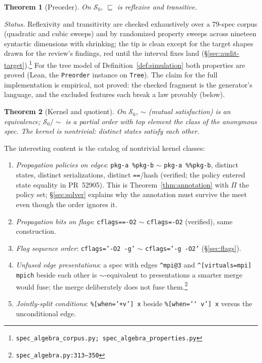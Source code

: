 \documentclass[11pt]{article}
\newtheorem{theorem}{Theorem}[section]
\theoremstyle{definition}
\theoremstyle{remark}
\newcommand{\sat}{\sqsubseteq}
\renewcommand{\ker}{\sim}
\newcommand{\Spec}{\mathcal{S}}
\newcommand{\code}[1]{\texttt{#1}}
\newcommand{\src}[1]{\footnote{\code{#1}}}
\begin{document}
\begin{theorem}[Preorder]\label{thm:preorder}
On $\Spec_0$, $\sat$ is reflexive and transitive.
\end{theorem}

\emph{Status.}  Reflexivity and transitivity are checked exhaustively over a
79-spec corpus (quadratic and cubic sweeps) and by randomized property
sweeps across nineteen syntactic dimensions with shrinking; the tip is
clean except for the target shapes drawn for the review's findings, red
until the interval fixes land
(\S\ref{sec:audit-target}).\src{spec\_algebra\_corpus.py;
spec\_algebra\_properties.py}  For the
tree model of Definition~\ref{def:simulation} both properties are proved
(Lean, the \code{Preorder} instance on \code{Tree}).  The claim for the full implementation is empirical,
not proved: the checked fragment is the generator's language, and the
excluded features each break a law provably (below).

\begin{theorem}[Kernel and quotient]\label{thm:kernel}
On $\Spec_0$, $\ker$ (mutual satisfaction) is an equivalence;
$\Spec_0/\!\ker$ is a partial order with top element the class of the
anonymous spec.  The kernel is nontrivial: distinct states satisfy each other.
\end{theorem}

The interesting content is the catalog of nontrivial kernel classes:

\begin{enumerate}[itemsep=2pt]
\item \emph{Propagation policies on edges}: \code{pkg-a \%pkg-b} $\ker$
      \code{pkg-a \%\%pkg-b}, distinct states, distinct serializations,
      distinct \code{==}/hash (verified; the policy entered state equality in
      PR~52905).  This is Theorem~\ref{thm:annotation} with $\Pi$ the policy
      set; \S\ref{sec:solver} explains why the annotation must survive the
      meet even though the order ignores it.
\item \emph{Propagation bits on flags}: \code{cflags==-O2} $\ker$
      \code{cflags=-O2} (verified), same construction.
\item \emph{Flag sequence order}: \code{cflags='-O2 -g'} $\ker$
      \code{cflags='-g -O2'} (\S\ref{sec:flags}).
\item \emph{Unfused edge presentations}: a spec with edges
      \code{\^{}mpi@3} and \code{\^{}[virtuals=mpi] mpich} beside each other
      is $\ker$-equivalent to presentations a smarter merge would fuse; the
      merge deliberately does not fuse them.\src{spec\_algebra.py:313--350}
\item \emph{Jointly-split conditions}: \code{\%[when='+v'] x} beside
      \code{\%[when='\char`~v'] x} versus the unconditional edge.
\end{enumerate}
\end{document}
